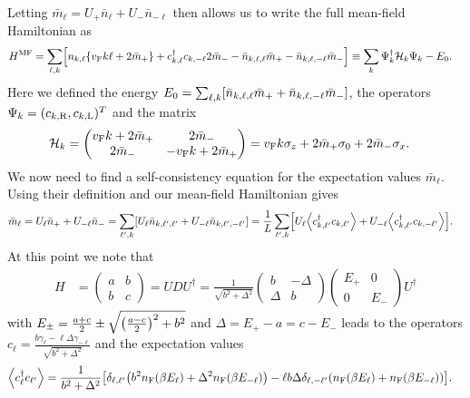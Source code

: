\documentclass[english, parskip=full]{scrartcl}
\begin{document}
Letting $\bar{m}_\ell = U_+ \bar{n}_\ell + U_- \bar{n}_{-\ell}$ then allows us to write the full mean-field Hamiltonian as
\begin{align}
H^\Text{MF} &= \sum_{\ell,k} \klb*{n_{k,\ell} \klc*{\vf k\ell + 2\bar{m}_+} + c_{k,\ell}^\dagger c_{k,-\ell} 2\bar{m}_- - \bar{n}_{k,\ell,\ell} \bar{m}_+ - \bar{n}_{k,\ell,-\ell} \bar{m}_-} \equiv \sum_{k} \Psi_k^\dagger \mathcal{H}_k \Psi_k - E_0.
\end{align}
Here we defined the energy $E_0 = \sum_{\ell,k} \klb*{\bar{n}_{k,\ell,\ell} \bar{m}_+ + \bar{n}_{k,\ell,-\ell} \bar{m}_-}$, the operators $\Psi_k = (c_{k,\R}, c_{k,\L})^T$ and the matrix
\begin{align}
\mathcal{H}_k &= \begin{pmatrix}
\vf k + 2\bar{m}_+ & 2\bar{m}_- \\ 2\bar{m}_-  & -\vf k + 2\bar{m}_+
\end{pmatrix} = \vf k \sigma_z + 2\bar{m}_+ \sigma_0 + 2\bar{m}_- \sigma_x .
\end{align}
We now need to find a self-consistency equation for the expectation values $\bar{m}_\ell$.
Using their definition and our mean-field Hamiltonian gives
\begin{align}
\bar{m}_\ell &= U_\ell \bar{n}_+ + U_{-\ell} \bar{n}_- = \sum_{\ell',k} \klb*{U_{\ell} \bar{n}_{k,\ell',\ell'} + U_{-\ell} \bar{n}_{k,\ell',-\ell'}} = \frac{1}{L} \sum_{\ell',k} \klb*{U_{\ell} \bra*{c_{k,\ell'}^\dagger c_{k,\ell'}} + U_{-\ell} \bra*{c_{k,\ell'}^\dagger c_{k,-\ell'}}}.
\end{align}
At this point we note that
\begin{align}
H&=\begin{pmatrix}
a&b \\ b&c
\end{pmatrix} = UDU^\dagger = \frac{1}{\sqrt{b^2+\Delta^2}} \begin{pmatrix}
b&-\Delta \\ \Delta & b
\end{pmatrix} \begin{pmatrix}
E_+ & 0 \\ 0 & E_-
\end{pmatrix} U^\dagger
\end{align}
with $E_\pm = \frac{a+c}{2} \pm \sqrt{\kla*{\frac{a-c}{2}}^2 + b^2}$ and $\Delta = E_+-a=c-E_-$ leads to the operators $c_\ell = \frac{b\gamma_\ell - \ell\Delta \gamma_{-\ell}}{\sqrt{b^2+\Delta^2}}$ and the expectation values
\begin{align}
\bra*{c_\ell^\dagger c_{\ell'}} &= \frac{1}{b^2+\Delta^2} \klb*{\delta_{\ell,\ell'} \kla*{b^2 n_\F(\beta E_{\ell}) + \Delta^2 n_\F(\beta E_{-\ell})} - \ell b\Delta \delta_{\ell,-\ell'} \kla*{n_\F(\beta E_{\ell}) + n_\F(\beta E_{-\ell})}}.
\end{align}
\end{document}
